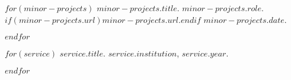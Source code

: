 \documentclass[11pt,article,oneside]{memoir}
\begin{document}
\smallskip

$for(minor-projects)$
\ind \emph{$minor-projects.title$}. $minor-projects.role$. $if(minor-projects.url)$\href{$minor-projects.url$}{$minor-projects.url$}.$endif$ $minor-projects.date$.
\smallskip

$endfor$

\bigskip
\pagebreak[1]


%
%
%
%
%
%

$for(service)$
\ind $service.title$. $service.institution$, $service.year$.

\pagebreak[1]
$endfor$

\smallskip
\bigskip

%
%
%
%

\thispagestyle{jtmcolophon}
\end{document}
